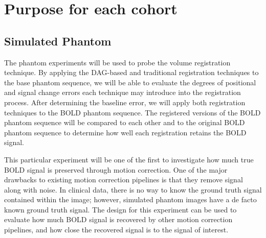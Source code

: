 

\section{Purpose for each cohort}

\subsection{Simulated Phantom}

The phantom experiments will be used to probe the volume registration technique. By applying the DAG-based and traditional registration techniques to the base phantom sequence, we will be able to evaluate the degrees of positional and signal change errors each technique may introduce into the registration process. After determining the baseline error, we will apply both registration techniques to the BOLD phantom sequence. The registered versions of the BOLD phantom sequence will be compared to each other and to the original BOLD phantom sequence to determine how well each registration retains the BOLD signal.

This particular experiment will be one of the first to investigate how much true BOLD signal is preserved through motion correction. One of the major drawbacks to existing motion correction pipelines is that they remove signal along with noise. In clinical data, there is no way to know the ground truth signal contained within the image; however, simulated phantom images have a de facto known ground truth signal. The design for this experiment can be used to evaluate how much BOLD signal is recovered by other motion correction pipelines, and how close the recovered signal is to the signal of interest.

